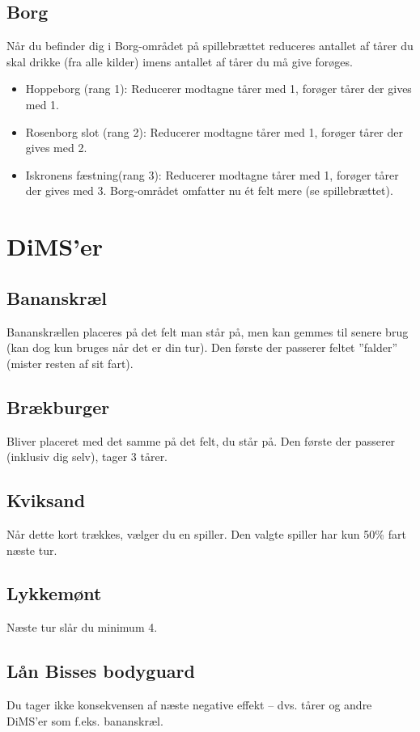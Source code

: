 \documentclass{article}
\begin{document}
\subsection{Borg}
Når du befinder dig i Borg-området på spillebrættet reduceres antallet af tårer du skal drikke (fra alle kilder) imens antallet af tårer du må give forøges.

\begin{itemize}
	\item Hoppeborg (rang 1): Reducerer modtagne tårer med 1, forøger tårer der gives med 1.
	\item Rosenborg slot (rang 2): Reducerer modtagne tårer med 1, forøger tårer der gives med 2.
	\item Iskronens fæstning(rang 3): Reducerer modtagne tårer med 1, forøger tårer der gives med 3. Borg-området omfatter nu ét felt mere (se spillebrættet).
\end{itemize}


\section{DiMS'er}

\subsection{Bananskræl} 
Bananskrællen placeres på det felt man står på, men kan gemmes til senere brug (kan dog kun bruges når det er din tur). Den første der passerer feltet ”falder” (mister resten af sit fart).
 
\subsection{Brækburger} 
Bliver placeret med det samme på det felt, du står på. Den første der passerer (inklusiv dig selv), tager 3 tårer.
 
\subsection{Kviksand} 
Når dette kort trækkes, vælger du en spiller. Den valgte spiller har kun 50\% fart næste tur.
 
\subsection{Lykkemønt} 
Næste tur slår du minimum 4.
 
\subsection{Lån Bisses bodyguard} 
Du tager ikke konsekvensen af næste negative effekt – dvs. tårer og andre DiMS'er som f.eks. bananskræl.
 
\end{document}
